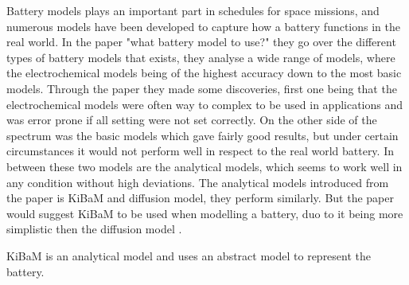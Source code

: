 



Battery models plays an important part in schedules for space missions, and numerous models have been developed to capture how a battery functions in the real world. In the paper "what battery model to use?"\cite{battery_model} they go over the different types of battery models that exists, they analyse a wide range of models, where the electrochemical models being of the highest accuracy down to the most basic models. 
Through the paper\cite{battery_model} they made some discoveries, first one being that the electrochemical models were often way to complex to be used in applications and was error prone if all setting were not set correctly. On the other side of the spectrum was the basic models which gave fairly good results, but under certain circumstances it would not perform well in respect to the real world battery. In between these two models are the analytical models, which seems to work well in any condition without high deviations. The analytical models introduced from the paper is KiBaM and diffusion model, they perform similarly. But the paper would suggest KiBaM to be used when modelling a battery, duo to it being more simplistic then the diffusion model \cite{battery_model}.

KiBaM is an analytical model and uses an abstract model to represent the battery.